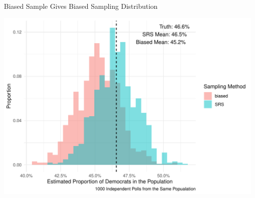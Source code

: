 \documentclass[ignorenonframetext, 10.5pt, aspectratio=169]{beamer}
\begin{document}
\begin{frame}
{Biased Sample Gives Biased Sampling Distribution}

\centering
\includegraphics[width = 0.8\linewidth]{sampling.pdf}
\end{frame}
\end{document}
